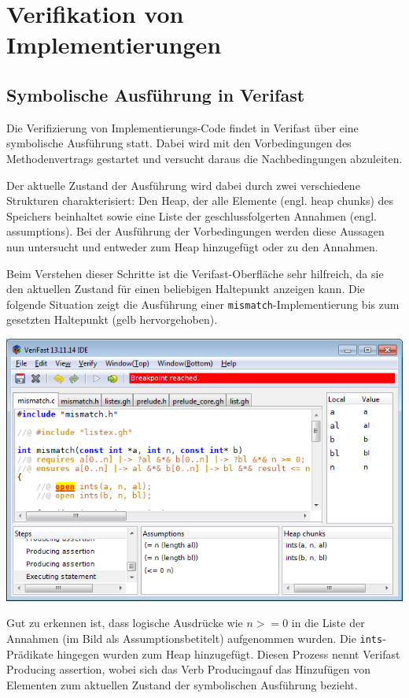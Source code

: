 ﻿\section{Verifikation von Implementierungen}

\subsection{Symbolische Ausführung in Verifast}

Die Verifizierung von Implementierungs-Code findet in Verifast über eine symbolische Ausführung statt.
Dabei wird mit den Vorbedingungen des Methodenvertrags gestartet und versucht daraus die
Nachbedingungen abzuleiten.

Der aktuelle Zustand der Ausführung wird dabei durch zwei verschiedene Strukturen charakterisiert: 
Den Heap, der alle Elemente (engl. heap chunks) des Speichers beinhaltet sowie eine Liste
der geschlussfolgerten Annahmen (engl. assumptions). Bei der Ausführung der Vorbedingungen werden
diese Aussagen nun untersucht und entweder zum Heap hinzugefügt oder zu den Annahmen.

Beim Verstehen dieser Schritte ist die Verifast-Oberfläche sehr hilfreich, da sie den aktuellen
Zustand für einen beliebigen Haltepunkt anzeigen kann. Die folgende Situation zeigt die Ausführung
einer \lstinline{mismatch}-Implementierung bis zum gesetzten Haltepunkt (gelb hervorgehoben).

\begin{center}
\includegraphics[width=1.0\textwidth]{images/verifast-state-after-precondition.png}
\end{center}

Gut zu erkennen ist, dass logische Ausdrücke wie \(n >= 0\) in die Liste der Annahmen 
(im Bild als \glqq Assumptions\grqq betitelt) aufgenommen wurden. Die \lstinline{ints}-Prädikate hingegen
wurden zum Heap hinzugefügt. Diesen Prozess nennt Verifast \glqq Producing assertion\grqq, wobei sich das Verb
\glqq Producing\grqq auf das Hinzufügen von Elementen zum aktuellen Zustand der symbolischen Ausführung
bezieht.

